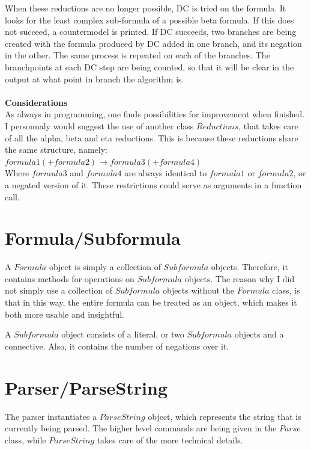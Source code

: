 \documentclass{article}
\begin{document}
When these reductions are no longer possible, DC is tried on the formula. It looks for the least complex sub-formula of a possible beta formula. If this does not succeed, a countermodel is printed. If DC succeeds, two branches are being created with the formula produced by DC added in one branch, and its negation in the other. The same process is repeated on each of the branches. The branchpoints at each DC step are being counted, so that it will be clear in the output at what point in branch the algorithm is.\\\\
{\bf Considerations}\\
As always in programming, one finds possibilities for improvement when finished. I personnaly would suggest the use of another class $Reductions$, that takes care of all the alpha, beta and eta reductions. This is because these reductions share the same structure, namely:\\
$formula1(+formula2) \rightarrow formula3(+formula4)$\\
Where $formula3$ and $formula4$ are always identical to $formula1$ or $formula2$, or a negated version of it. These restrictions could serve as arguments in a function call.

\section{Formula/Subformula}
A $Formula$ object is simply a collection of $Subformula$ objects. Therefore, it contains methods for operations on $Subformula$ objects. The reason why I did not simply use a collection of $Subformula$ objects without the $Formula$ class, is that in this way, the entire formula can be treated as an object, which makes it both more usable and insightful.

A $Subformula$ object consists of a literal, or two $Subformula$ objects and a connective. Also, it contains the number of negations over it.

\section{Parser/ParseString}
The parser instantiates a $ParseString$ object, which represents the string that is currently being parsed. The higher level commands are being given in the $Parse$ class, while $ParseString$ takes care of the more technical details.
\end{document}

